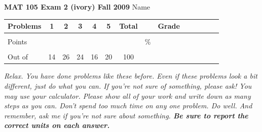 \documentclass[12pt]{article}
\begin{document}
\textbf{MAT 105 Exam 2 (ivory) Fall 2009} \hspace{.4in} {\large Name} \hrulefill

\begin{center}

\begin{tabular}
{|l|c|c|c|c|c|c|c|c|c|c|c|c|c|} \hline

 Problems & \hspace{5 pt} 1 \hspace{5 pt}  & \hspace{5 pt} 2 \hspace{5 pt} & \hspace{5 pt} 3  \hspace{5 pt} & \hspace{5 pt} 4  \hspace{5 pt} & \hspace{5 pt}5 \hspace{5 pt} & \hspace{5 pt} Total  \hspace{5 pt} & &  \hspace{5 pt} Grade \hspace{5 pt}  \\ \hline
&&&&&&&&\\  
Points &&&&&&&    \hspace{.8in}\% &  \\ 
&&&&&&&& \\  \hline
Out of & 14 & 26 & 24  & 16 & 20 &100 & & \\ \hline

\end {tabular}

\end{center}

\vspace{.2in}

 \emph{Relax.  You have done problems like these before.  Even if these problems look a bit different, just do what you can.  If you're not sure of something, please ask! You may use your calculator.  Please show all of your work and write down as many steps as you can.  Don't spend too much time on any one problem.  Do well.  And remember, ask me if you're not sure about something. \textbf{Be sure to report the correct units on each answer.}}

\hrulefill
\end{document}
